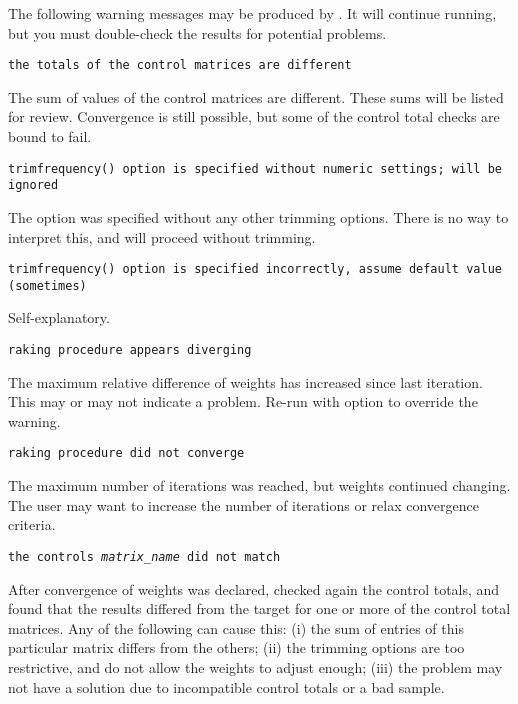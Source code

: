\bigskip

The following warning messages may be produced by
. It will continue running, but you must
double-check the results for potential problems.

\noindent
    {\tt the totals of the control matrices are different}

    \morehang
    The sum of values of the control matrices are different.
    These sums will be listed for review. Convergence is still
    possible, but some of the control total checks are bound to fail.

    \noindent
    {\tt trimfrequency() option is specified without numeric settings; will be ignored}

    \morehang
    The option  was specified without any other trimming options.
    There is no way to interpret this, and  will proceed without
    trimming.

    \noindent
    {\tt trimfrequency() option is specified incorrectly, assume default value (sometimes)}

    \morehang
    Self-explanatory.

    \noindent
    {\tt raking procedure appears diverging}

    \morehang
    The maximum relative difference of weights has increased since last
    iteration. This may or may not indicate a problem. Re-run 
    with  option to override the warning.

    \noindent
    {\tt raking procedure did not converge}

    \morehang
    The maximum number of iterations was reached, but weights continued
    changing. The user may want to increase the number of iterations
    or relax convergence criteria.

    \noindent
    {\tt the controls {\it matrix{\_}name} did not match}

    \morehang
    After convergence of weights was declared, 
    checked again the control totals, and found that the results
    differed from the target for one or more of the control total
    matrices. Any of the following can cause this: (i) the sum of
    entries of this particular matrix differs from the others;
    (ii) the trimming options are too restrictive, and do not allow
    the weights to adjust enough; (iii) the problem may not have a
    solution due to incompatible control totals or a bad sample.

